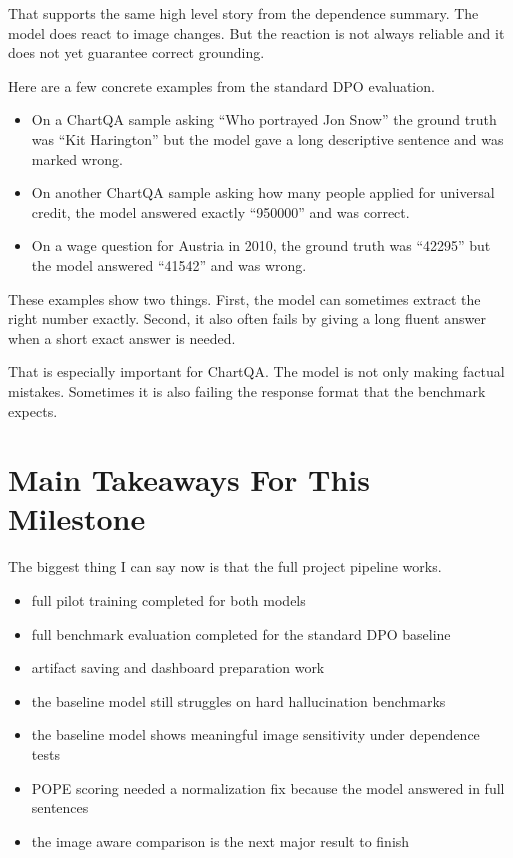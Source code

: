 \documentclass[11pt]{article}
\begin{document}
That supports the same high level story from the dependence summary.
The model does react to image changes.
But the reaction is not always reliable and it does not yet guarantee correct grounding.

Here are a few concrete examples from the standard DPO evaluation.

\begin{itemize}
    \item On a ChartQA sample asking ``Who portrayed Jon Snow'' the ground truth was ``Kit Harington'' but the model gave a long descriptive sentence and was marked wrong.
    \item On another ChartQA sample asking how many people applied for universal credit, the model answered exactly ``950000'' and was correct.
    \item On a wage question for Austria in 2010, the ground truth was ``42295'' but the model answered ``41542'' and was wrong.
\end{itemize}

These examples show two things.
First, the model can sometimes extract the right number exactly.
Second, it also often fails by giving a long fluent answer when a short exact answer is needed.

That is especially important for ChartQA.
The model is not only making factual mistakes.
Sometimes it is also failing the response format that the benchmark expects.

\section*{Main Takeaways For This Milestone}
The biggest thing I can say now is that the full project pipeline works.

\begin{itemize}
    \item full pilot training completed for both models
    \item full benchmark evaluation completed for the standard DPO baseline
    \item artifact saving and dashboard preparation work
    \item the baseline model still struggles on hard hallucination benchmarks
    \item the baseline model shows meaningful image sensitivity under dependence tests
    \item POPE scoring needed a normalization fix because the model answered in full sentences
    \item the image aware comparison is the next major result to finish
\end{itemize}
\end{document}
